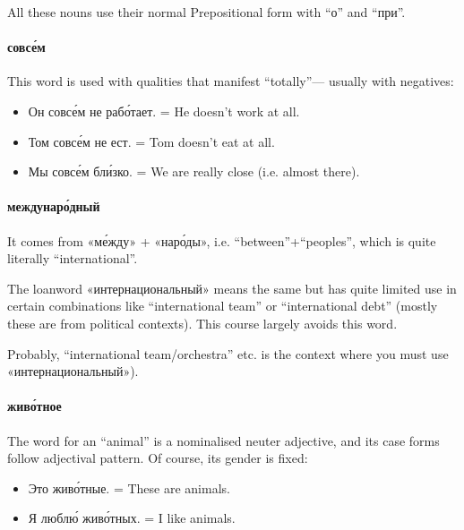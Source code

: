 All these nouns use their normal Prepositional form with ``о'' and
``при''.

\paragraph{совс\'{е}м}\label{ux441ux43eux432ux441ux435ux43c}

This word is used with qualities that manifest ``totally''--- usually
with negatives:

\begin{itemize}
\tightlist
\item
  Он совс\'{е}м не раб\'{о}тает. = He doesn't work at all.
\item
  Том совс\'{е}м не ест. = Tom doesn't eat at all.
\item
  Мы совс\'{е}м бл\'{и}зко. = We are really close (i.e. almost there).
\end{itemize}

\paragraph{междунар\'{о}дный}\label{ux43cux435ux436ux434ux443ux43dux430ux440ux43eux434ux43dux44bux439}

It comes from «м\'{е}жду» + «нар\'{о}ды», i.e. ``between''+``peoples'', which is
quite literally ``international''.

The loanword «интернациональный» means the same but has quite limited
use in certain combinations like ``international team'' or
``international debt'' (mostly these are from political contexts). This
course largely avoids this word.

Probably, ``international team/orchestra'' etc. is the context where you
must use «интернациональный»).

\paragraph{жив\'{о}тное}\label{ux436ux438ux432ux43eux442ux43dux43eux435}

The word for an ``animal'' is a nominalised neuter adjective, and its
case forms follow adjectival pattern. Of course, its gender is fixed:

\begin{itemize}
\tightlist
\item
  Это жив\'{о}тные. = These are animals.
\item
  Я любл\'{ю} жив\'{о}тных. = I like animals.
\end{itemize}

